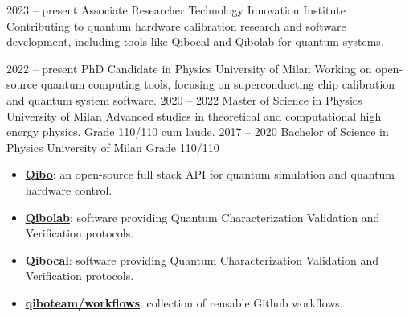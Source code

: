 \documentclass[9pt]{developercv} %
\begin{document}



\begin{entrylist}
	\entry
		{2023 -- present}
		{Associate Researcher}
		{Technology Innovation Institute}
		{Contributing to quantum hardware calibration research and software development, 
        including tools like Qibocal and Qibolab for quantum systems.}
\end{entrylist}



\begin{entrylist}
	\entry
		{2022 -- present}
		{PhD Candidate in Physics}
		{University of Milan}
		{Working on open-source quantum computing tools, focusing on superconducting
        chip calibration and quantum system software.}
	\entry
		{2020 -- 2022}
		{Master of Science in Physics}
		{University of Milan}
        {Advanced studies in theoretical and computational high energy physics.
        Grade 110/110 cum laude.}
	\entry
		{2017 -- 2020}
		{Bachelor of Science in Physics}
		{University of Milan}
		{Grade 110/110}
\end{entrylist}

\begin{itemize}[topsep=0pt]
    \addtolength{\itemindent}{65px}
    \setlength\itemsep{1px}
    \item[\faGithub] \href{https://github.com/qiboteam/qibo}{\underline{\textbf{Qibo}}}:
         an open-source full stack API for quantum simulation and quantum hardware control.
     \item[\faGithub] \href{https://github.com/qiboteam/qibolab}{\underline{\textbf{Qibolab}}}:
        software providing Quantum Characterization Validation and Verification protocols. 
    \item[\faGithub] \href{https://github.com/qiboteam/qibocal}{\underline{\textbf{Qibocal}}}:
        software providing Quantum Characterization Validation and Verification protocols. 
    \item[\faGithub] \href{https://github.com/qiboteam/workflows}{\underline{\textbf{qiboteam/workflows}}}:
        collection of reusable Github workflows.
\end{itemize}
\end{document}
